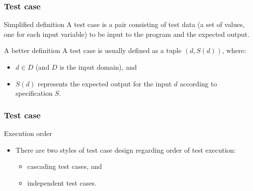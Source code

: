 \begin{frame}[parent={cmap:software-testing},hasnext=true,hasprev=true]
\frametitle{Test case}
\label{concept:test-case}
\label{concept:input-domain}
\label{concept:output-domain}
\label{concept:input-data}
\label{concept:output-data}

\begin{block:concept}{Simplified definition}
A test case is a pair consisting of test data (a set of values, one for each
input variable) to be input to the program and the expected output.
\end{block:concept}


\begin{block:concept}{A better definition}
A test case is usually defined as a tuple $(d, S(d))$, where:
\begin{itemize}
	\item $d \in D$ (and $D$ is the input domain), and
	\item $S(d)$ represents the expected output for the input $d$
	according to specification $S$.
\end{itemize}
\end{block:concept}

\hfill
{}
\end{frame}


\begin{frame}
\frametitle{Test case}

\begin{block:fact}{Execution order}
\begin{itemize}
    \item There are two styles of test case design regarding order of test
    execution:
	\begin{itemize}
		\item cascading test cases, and
		\item independent test cases.
	\end{itemize}
\end{itemize}
\end{block:fact}
\end{frame}


